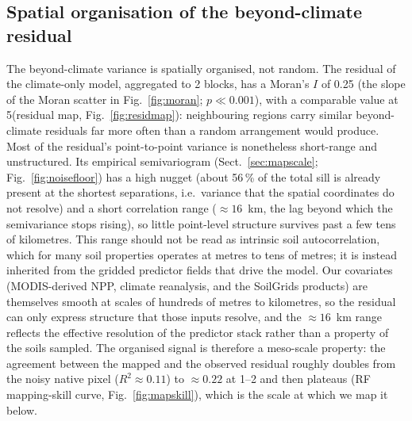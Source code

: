 \documentclass[12pt, a4paper]{article}
\begin{document}
\subsection{Spatial organisation of the beyond-climate residual}
\label{sec:results_moran}

The beyond-climate variance is spatially organised, not random. The residual of
the climate-only model, aggregated to 2\textdegree{} blocks, has a Moran's $I$ of
0.25 (the slope of the Moran scatter in Fig.~\ref{fig:moran}; $p\ll0.001$), with
a comparable value at 5\textdegree (residual map, Fig.~\ref{fig:residmap}):
neighbouring regions carry similar beyond-climate residuals far more often than a
random arrangement would produce. Most of the residual's point-to-point variance
is nonetheless short-range and unstructured. Its empirical semivariogram (Sect.~\ref{sec:mapscale}; Fig.~\ref{fig:noisefloor}) has a high nugget (about
56\,\% of the total sill is already present at the shortest separations, i.e.\
variance that the spatial coordinates do not resolve) and a short correlation
range ($\approx16$~km, the lag beyond which the semivariance stops rising),
so little point-level structure survives past a few tens of kilometres. This
range should not be read as intrinsic soil autocorrelation, which for many soil
properties operates at metres to tens of metres; it is instead inherited from the
gridded predictor fields that drive the model. Our covariates (MODIS-derived NPP,
climate reanalysis, and the SoilGrids products) are themselves smooth at scales of
hundreds of metres to kilometres, so the residual can only express structure that
those inputs resolve, and the $\approx16$~km range reflects the effective
resolution of the predictor stack rather than a property of the soils sampled. The
organised signal is therefore a meso-scale property: the agreement between the
mapped and the observed residual roughly doubles from the noisy native pixel
($R^2\approx0.11$) to $\approx0.22$ at 1--2\textdegree{} and then plateaus
(RF mapping-skill curve, Fig.~\ref{fig:mapskill}), which is the scale at which we
map it below.
\end{document}

